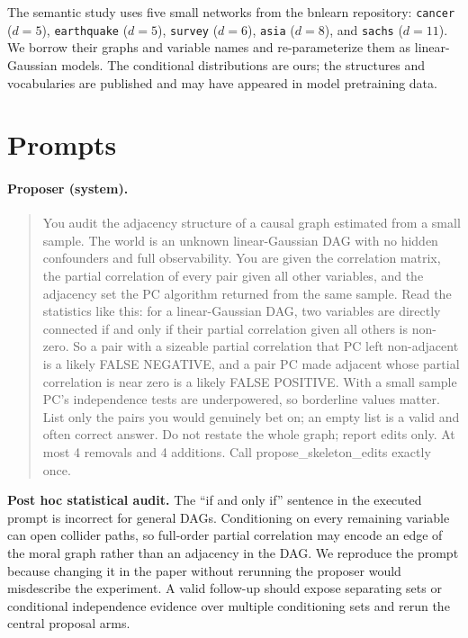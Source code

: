 \documentclass{article}
\begin{document}
The semantic study uses five small networks from the bnlearn repository: \texttt{cancer}
($d{=}5$), \texttt{earthquake} ($d{=}5$), \texttt{survey} ($d{=}6$), \texttt{asia} ($d{=}8$), and
\texttt{sachs} ($d{=}11$). We borrow their graphs and variable names and re-parameterize them as
linear-Gaussian models. The conditional distributions are ours; the structures and vocabularies
are published and may have appeared in model pretraining data.

\section{Prompts}
\label{app:prompts}

\paragraph{Proposer (system).}
\begin{quote}\small\ttfamily
You audit the adjacency structure of a causal graph estimated from a small sample. The world is an
unknown linear-Gaussian DAG with no hidden confounders and full observability. You are given the
correlation matrix, the partial correlation of every pair given all other variables, and the
adjacency set the PC algorithm returned from the same sample. Read the statistics like this: for a
linear-Gaussian DAG, two variables are directly connected if and only if their partial correlation
given all others is non-zero. So a pair with a sizeable partial correlation that PC left
non-adjacent is a likely FALSE NEGATIVE, and a pair PC made adjacent whose partial correlation is
near zero is a likely FALSE POSITIVE. With a small sample PC's independence tests are underpowered,
so borderline values matter. List only the pairs you would genuinely bet on; an empty list is a
valid and often correct answer. Do not restate the whole graph; report edits only. At most 4
removals and 4 additions. Call propose\_skeleton\_edits exactly once.
\end{quote}

\textbf{Post hoc statistical audit.} The ``if and only if'' sentence in the executed prompt is
incorrect for general DAGs. Conditioning on every remaining variable can open collider paths, so
full-order partial correlation may encode an edge of the moral graph rather than an adjacency in
the DAG. We reproduce the prompt because changing it in the paper without rerunning the proposer
would misdescribe the experiment. A valid follow-up should expose separating sets or conditional
independence evidence over multiple conditioning sets and rerun the central proposal arms.
\end{document}
